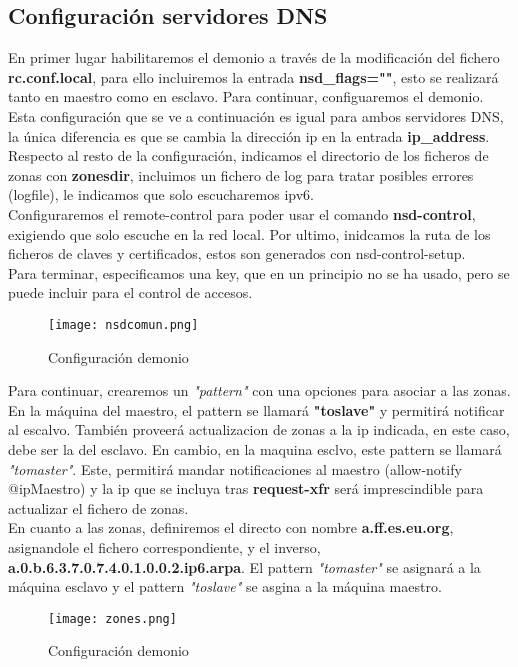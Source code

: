 \documentclass{article}
\begin{document}
\subsection{Configuración servidores DNS}
En primer lugar habilitaremos el demonio a través de la modificación del fichero \textbf{rc.conf.local}, para ello incluiremos la entrada \textbf{nsd\_flags=""}, esto se realizará tanto en maestro como en esclavo.
Para continuar, configuaremos el demonio. Esta configuración que se ve a continuación es igual para ambos servidores DNS, la única diferencia es que se cambia la dirección ip en la entrada \textbf{ip\_address}.\\
Respecto al resto de la configuración, indicamos el directorio de los ficheros de zonas con \textbf{zonesdir}, incluimos un fichero de log para tratar posibles errores (logfile), le indicamos que solo escucharemos ipv6. \\
Configuraremos el remote-control para poder usar el comando \textbf{nsd-control}, exigiendo que solo escuche en la red local. Por ultimo, inidcamos la ruta de los ficheros de claves y certificados, estos son generados con nsd-control-setup.\\
Para terminar, especificamos una key, que en un principio no se ha usado, pero se puede incluir para el control de accesos.
\begin{figure}[!h]
	\centering
		\texttt{[image: nsdcomun.png]}
			\caption{Configuración demonio}
			\label{fig:nonflat}
\end{figure}\newpage
\pagebreak
Para continuar, crearemos un \textit{"pattern"} con una opciones para asociar a las zonas. \\En la máquina del maestro, el pattern se llamará \textbf{"toslave"} y permitirá notificar al escalvo. También proveerá actualizacion de zonas a la ip indicada, en este caso, debe ser la del esclavo.
En cambio, en la maquina esclvo, este pattern se llamará \textit{"tomaster"}. Este, permitirá mandar notificaciones al maestro (allow-notify @ipMaestro) y la ip que se incluya tras \textbf{request-xfr} será imprescindible para actualizar el fichero de zonas.\\
En cuanto a las zonas, definiremos el directo con nombre \textbf{a.ff.es.eu.org}, asignandole el fichero correspondiente, y el inverso, \textbf{a.0.b.6.3.7.0.7.4.0.1.0.0.2.ip6.arpa}. El pattern\textit{ "tomaster"} se asignará a la máquina esclavo y el pattern \textit{"toslave"} se asgina a la máquina maestro.
\begin{figure}[!h]
	\centering
		\texttt{[image: zones.png]}
			\caption{Configuración demonio}
			\label{fig:nonflat}
\end{figure}
\newline
\end{document}
